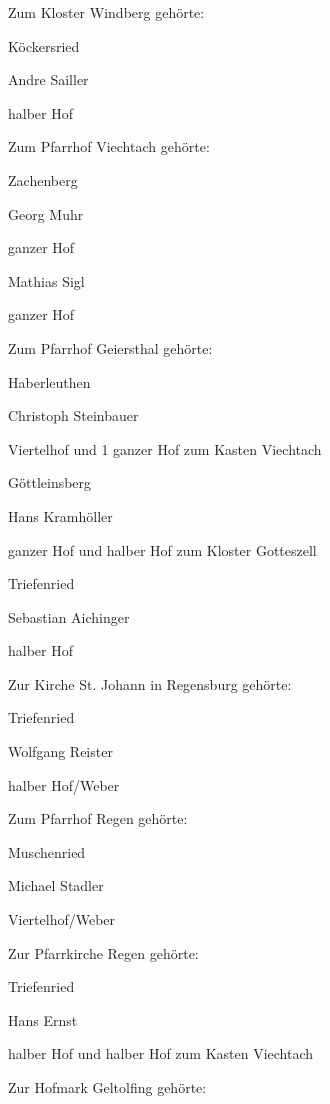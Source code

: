 \documentclass[12pt,a4pager]{book}
\begin{document}
Zum Kloster Windberg gehörte:



Köckersried

Andre Sailler

halber Hof



Zum Pfarrhof Viechtach gehörte:



Zachenberg

Georg Muhr

ganzer Hof



Mathias Sigl

ganzer Hof



Zum Pfarrhof Geiersthal gehörte:



Haberleuthen

Christoph Steinbauer

Viertelhof und 1 ganzer Hof zum Kasten Viechtach

Göttleinsberg

Hans Kramhöller

ganzer Hof und halber Hof zum Kloster Gotteszell

Triefenried

Sebastian Aichinger

halber Hof



Zur Kirche St. Johann in Regensburg gehörte:



Triefenried

Wolfgang Reister

halber Hof/Weber



Zum Pfarrhof Regen gehörte:



Muschenried

Michael Stadler

Viertelhof/Weber



Zur Pfarrkirche Regen gehörte:



Triefenried

Hans Ernst

halber Hof und halber Hof zum Kasten Viechtach



Zur Hofmark Geltolfing gehörte:
\end{document}
